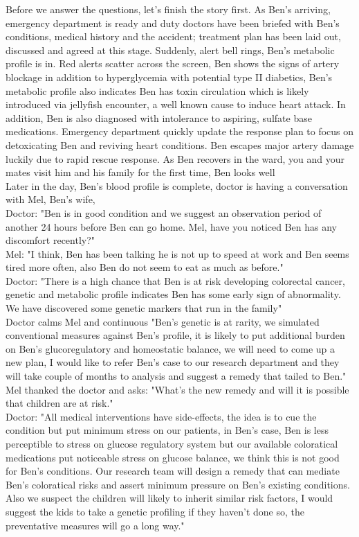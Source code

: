 Before we answer the questions, let's finish the story first. As Ben's arriving, emergency department is ready and duty doctors have been briefed with Ben's conditions, medical history and the accident; treatment plan has been laid out, discussed and agreed at this stage. Suddenly, alert bell rings, Ben's metabolic profile is in. Red alerts scatter across the screen, Ben shows the signs of artery blockage in addition to hyperglycemia with potential type II diabetics, Ben's metabolic profile also indicates Ben has toxin circulation which is likely introduced via jellyfish encounter, a well known cause to induce heart attack. In addition, Ben is also diagnosed with intolerance to aspiring, sulfate base medications. Emergency department quickly update the response plan to focus on  detoxicating Ben and reviving heart conditions. Ben escapes major artery damage luckily due to rapid rescue response. As Ben recovers in the ward, you and your mates visit him and his family for the first time, Ben looks well \\
Later in the day, Ben's blood profile is complete, doctor is having a conversation with Mel, Ben's wife, \\
Doctor: "Ben is in good condition and we suggest an observation period of another 24 hours before Ben can go home. Mel, have you noticed Ben has any discomfort recently?" \\
Mel: "I think, Ben has been talking he is not up to speed at work and Ben seems tired more often, also Ben do not seem to eat as much as before." \\
Doctor: "There is a high chance that Ben is at risk developing colorectal cancer, genetic and metabolic profile indicates Ben has some early sign of abnormality. We have discovered some genetic markers that run in the family" \\
Doctor calms Mel and continuous "Ben's genetic is at rarity, we simulated conventional measures against Ben's profile, it is likely to put additional burden on Ben's glucoregulatory and homeostatic balance, we will need to come up a new plan, I would like to refer Ben's case to our research department and they will take couple of months to analysis and suggest a remedy that tailed to Ben." \\
Mel thanked the doctor and asks: "What's the new remedy and will it is possible that children are at risk." \\
Doctor: "All medical interventions have side-effects, the idea is to cue the condition but put minimum stress on our patients, in Ben's case, Ben is less perceptible to stress on glucose regulatory system but our available coloratical medications put noticeable stress on glucose balance, we think this is not good for Ben's conditions. Our research team will design a remedy that can mediate Ben's coloratical risks and assert minimum pressure on Ben's existing conditions. Also we suspect the children will likely to inherit similar risk factors, I would suggest the kids to take a genetic profiling if they haven't done so, the preventative measures will go a long way." \\
